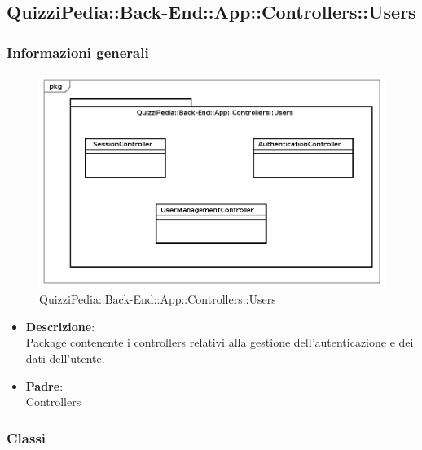 \subsection{QuizziPedia::Back-End::App::Controllers::Users}
\subsubsection{Informazioni generali}
\label{QuizziPedia::Back-End::App::Controllers::Users}
\begin{figure}[ht]
	\centering
	\includegraphics[scale=0.45]{UML/Package/QuizziPedia_Back-End_App_Controllers_Users.png}
	\caption{QuizziPedia::Back-End::App::Controllers::Users}
\end{figure}
\FloatBarrier
\begin{itemize}
	\item 
	\textbf{Descrizione}:\\
	Package contenente i controllers relativi alla gestione dell’autenticazione e dei dati dell’utente.
	\item
	\textbf{Padre}:\\
	Controllers
\end{itemize}	
\subsubsection{Classi}
